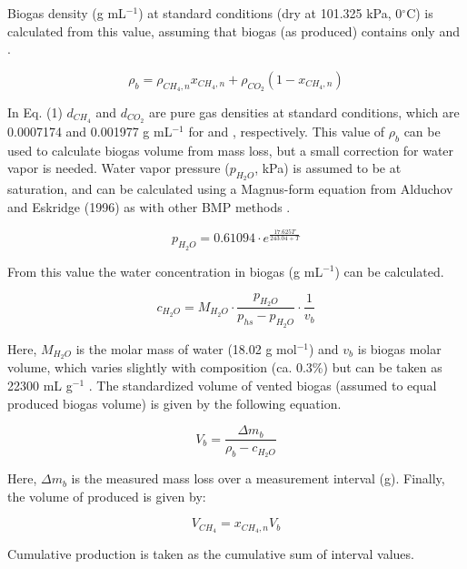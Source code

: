 \documentclass[]{article}
\begin{document}
Biogas density (g mL$^{-1}$) at standard conditions (dry at 101.325 kPa, 0$^\circ$C) is calculated from this value, assuming that biogas (as produced) contains only  and .

\begin{equation}
  \label{eq:dens1}
  \rho_b = \rho_{CH_4,n} x_{CH_4,n} + \rho_{CO_2} (1 - x_{CH_4,n})
\end{equation}

In Eq. (1) $d_{CH_4}$ and $d_{CO_2}$ are pure gas densities at standard conditions, which are 0.0007174 and 0.001977 g mL$^{-1}$ for  and , respectively.
This value of $\rho_b$ can be used to calculate biogas volume from mass loss, but a small correction for water vapor is needed.
Water vapor pressure ($p_{H_2O}$, kPa) is assumed to be at saturation, and can be calculated using a Magnus-form equation from Alduchov and Eskridge (1996) as with other BMP methods \cite{bmpmethods}.

\begin{equation}
\label{eq:magnus}
   p_{H_2O} = 0.61094 \cdot e^{\frac{17.625 T}{243.04 + T}}
\end{equation}

From this value the water concentration in biogas (g mL$^{-1}$) can be calculated.

\begin{equation}
  \label{eq:ch2o}
  c_{H_2O}=M_{H_2O} \cdot \frac{p_{H_2O}}{p_{hs} - p_{H_2O}} \cdot \frac{1}{v_b}
\end{equation}

Here, $M_{H_2O}$ is the molar mass of water (18.02 g mol$^{-1}$) and $v_b$ is biogas molar volume, which varies slightly with composition (ca. 0.3\%) but can be taken as 22300 mL g$^{-1}$ \cite{validation}.
The standardized volume of vented biogas (assumed to equal produced biogas volume) is given by the following equation.

\begin{equation}
  \label{eq:vb1}
  V_b = \frac{\Delta m_b}{\rho_b - c_{H_2O}}
\end{equation}

Here, $\Delta m_b$ is the measured mass loss over a measurement interval (g).
Finally, the volume of  produced is given by:

\begin{equation}
  \label{eq:vch41}
  V_{CH_4} = x_{CH_4, n} V_b
\end{equation}

Cumulative production is taken as the cumulative sum of interval values. 
\end{document}
